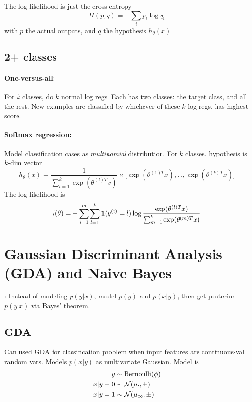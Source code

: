 \documentclass[11pt]{article}
\begin{document}
The log-likelihood is just the cross entropy
\begin{equation}
  H(p,q) = -\sum_i p_i \log q_i
\end{equation}
with $p$ the actual outputs, and $q$ the hypothesis $h_\theta(x)$

\subsection{2+ classes}

\paragraph{One-versus-all:} For $k$ classes, do $k$ normal log regs. Each has
two classes: the target class, and all the rest. New examples are classified by
whichever of these $k$ log regs. has highest score.

\paragraph{Softmax regression:} Model classification cases as \emph{multinomial}
distribution. For $k$ classes, hypothesis is $k$-dim vector
\begin{equation}
  h_\theta (x) = \frac{1}{\sum_{l=1}^k \exp(\theta^{(l)T} x)} \times
  \big[\exp(\theta^{(1)T} x), \dots, \exp(\theta^{(k)T} x)\big]
\end{equation}
The log-likelihood is
\begin{equation}
  l(\theta) = - \sum_{i=1}^m \sum_{l=1}^k
  \mathbf{1}(y^{(i)} = l)
  \log \frac{\exp(\theta^{(l)T} x)}{\sum_{m=1}^k \exp(\theta^{(m)T} x)}
\end{equation}




\section{Gaussian Discriminant Analysis (GDA) and Naive Bayes}
\label{sec:GDA_nbayes}
: Instead of modeling $p(y|x)$, model $p(y)$ and
$p(x|y)$, then get posterior $p(y|x)$ via Bayes' theorem.

\subsection{GDA}
Can used GDA for classification problem when input features are continuous-val
random vars. Models $p(x|y)$ as multivariate Gaussian. Model is
\begin{align}
  y &\sim \textrm{Bernoulli}(\phi) \\
  x|y=0 &\sim \mathcal{N(\mu_0, \Sigma)} \\
  x|y=1 &\sim \mathcal{N(\mu_1, \Sigma)}
\end{align}
\end{document}
